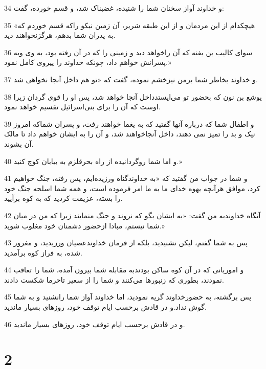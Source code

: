 \par 34 و خداوند آواز سخنان شما را شنیده، غضبناک شد، و قسم خورده، گفت:
\par 35 «هیچکدام از این مردمان و از این طبقه شریر، آن زمین نیکو راکه قسم خوردم که به پدران شما بدهم، هرگزنخواهند دید.
\par 36 سوای کالیب بن یفنه که آن راخواهد دید و زمینی را که در آن رفته بود، به وی وبه پسرانش خواهم داد، چونکه خداوند را پیروی کامل نمود.»
\par 37 و خداوند بخاطر شما برمن نیزخشم نموده، گفت که «تو هم داخل آنجا نخواهی شد.
\par 38 یوشع بن نون که بحضور تو می‌ایستدداخل آنجا خواهد شد، پس او را قوی گردان زیرا اوست که آن را برای بنی‌اسرائیل تقسیم خواهد نمود.
\par 39 و اطفال شما که درباره آنها گفتید که به یغما خواهند رفت، و پسران شماکه امروز نیک و بد را تمیز نمی دهند، داخل آنجاخواهند شد، و آن را به ایشان خواهم داد تا مالک آن بشوند.
\par 40 و اما شما روگردانیده از راه بحرقلزم به بیابان کوچ کنید.»
\par 41 و شما در جواب من گفتید که «به خداوندگناه ورزیده‌ایم، پس رفته، جنگ خواهیم کرد، موافق هرآنچه یهوه خدای ما به ما امر فرموده است، و همه شما اسلحه جنگ خود را بسته، عزیمت کردید که به کوه برآیید.
\par 42 آنگاه خداوندبه من گفت: «به ایشان بگو که نروند و جنگ منمایند زیرا که من در میان شما نیستم، مبادا ازحضور دشمنان خود مغلوب شوید.»
\par 43 پس به شما گفتم، لیکن نشنیدید، بلکه از فرمان خداوندعصیان ورزیدید، و مغرور شده، به فراز کوه برآمدید.
\par 44 و اموریانی که در آن کوه ساکن بودندبه مقابله شما بیرون آمده، شما را تعاقب نمودند، بطوری که زنبورها می‌کنند و شما را از سعیر تاحرما شکست دادند.
\par 45 پس برگشته، به حضورخداوند گریه نمودید، اما خداوند آواز شما رانشنید و به شما گوش نداد.و در قادش برحسب ایام توقف خود، روزهای بسیار ماندید.
\par 46 و در قادش برحسب ایام توقف خود، روزهای بسیار ماندید.
 
\chapter{2}

